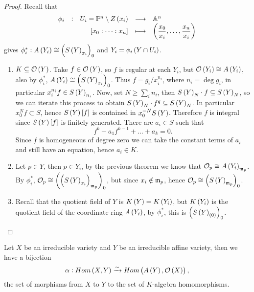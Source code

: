 \pagebreak

\begin{proof}
Recall that
$$ \function[\phi_i]{U_i = \PP^n \setminus Z\br{x_i}}{\AA^n}{\sbr{x_0 : \dots : x_n}}{\br{\dfrac{x_0}{x_i}, \dots, \dfrac{x_n}{x_i}}} $$
gives $ \phi_i^* : A\br{Y_i} \cong \br{S\br{Y}_{x_i}}_0 $ and $ Y_i = \phi_i\br{Y \cap U_i} $.
\begin{enumerate}
\item $ K \subseteq \OOO\br{Y} $. Take $ f \in \OOO\br{Y} $, so $ f $ is regular at each $ Y_i $, but $ \OOO\br{Y_i} \cong A\br{Y_i} $, also by $ \phi_i^* $, $ A\br{Y_i} \cong \br{S\br{Y}_{x_i}}_0 $. Thus $ f = g_i / x_i^{n_i} $, where $ n_i = \deg g_i $, in particular $ x_i^{n_i}f \in S\br{Y}_{n_i} $. Now, set $ N \ge \sum_i n_i $, then $ S\br{Y}_N \cdot f \subseteq S\br{Y}_N $, so we can iterate this process to obtain $ S\br{Y}_N \cdot f^q \subseteq S\br{Y}_N $. In particular $ x_0^Nf \subset S $, hence $ S\br{Y}\sbr{f} $ is contained in $ x_0^{-N}S\br{Y} $. Therefore $ f $ is integral since $ S\br{Y}\sbr{f} $ is finitely generated. There are $ a_i \in S $ such that
$$ f^k + a_1f^{k - 1} + \dots + a_k = 0. $$
Since $ f $ is homogeneous of degree zero we can take the constant terms of $ a_i $ and still have an equation, hence $ a_i \in K $.
\item Let $ p \in Y $, then $ p \in Y_i $, by the previous theorem we know that $ \OOO_p \cong A\br{Y_i}_{\mmm_p} $. By $ \phi_i^* $, $ \OOO_p \cong \br{\br{S\br{Y}_{x_i}}_{\mmm_p}}_0 $, but since $ x_i \notin \mathfrak{m}_p $, hence $ \OOO_p \cong \br{S\br{Y}_{\mmm_p}}_0 $.
\item Recall that the quotient field of $ Y $ is $ K\br{Y} = K\br{Y_i} $, but $ K\br{Y_i} $ is the quotient field of the coordinate ring $ A\br{Y_i} $, by $ \phi_i^* $, this is $ \br{S\br{Y}_{\br{0}}}_0 $.
\end{enumerate}
\end{proof}


\begin{proposition}
Let $ X $ be an irreducible variety and $ Y $ be an irreducible affine variety, then we have a bijection
$$ \alpha : Hom\br{X, Y} \xrightarrow{\sim} Hom\br{A\br{Y}, \OOO\br{X}}, $$
the set of morphisms from $ X $ to $ Y $ to the set of $ K $-algebra homomorphisms.
\end{proposition}

